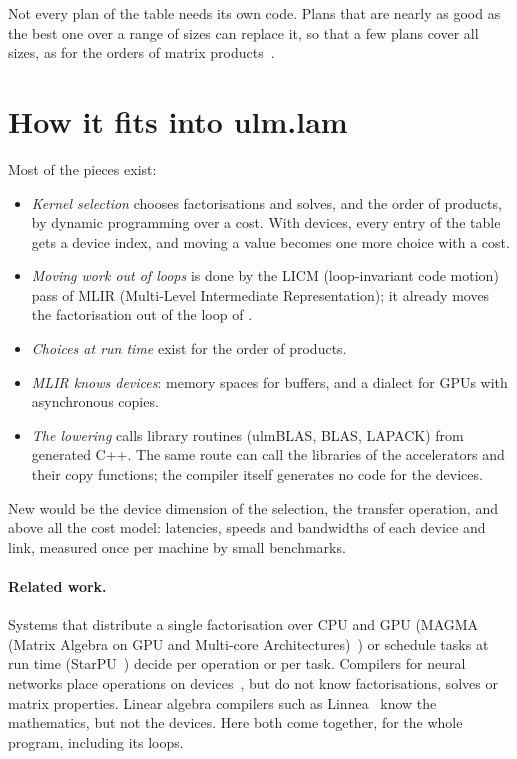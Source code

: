 \documentclass[11pt,a4paper]{article}
\let\origtexttt\texttt
\renewcommand{\texttt}[1]{\highLight[ttbg]{\origtexttt{#1}}}
\begin{document}
Not every plan of the table needs its own code. Plans that are nearly as
good as the best one over a range of sizes can replace it, so that a few
plans cover all sizes, as for the orders of matrix products~\cite{essential}.

\section{How it fits into ulm.lam}

Most of the pieces exist:
\begin{itemize}
\item \emph{Kernel selection} chooses factorisations and solves, and the
  order of products, by dynamic programming over a cost. With devices,
  every entry of the table gets a device index, and moving a value becomes
  one more choice with a cost.
\item \emph{Moving work out of loops} is done by the LICM (loop-invariant
  code motion) pass of MLIR (Multi-Level Intermediate Representation); it
  already moves the factorisation out of the loop of \texttt{fly}.
\item \emph{Choices at run time} exist for the order of products.
\item \emph{MLIR knows devices}: memory spaces for buffers, and a dialect
  for GPUs with asynchronous copies.
\item \emph{The lowering} calls library routines (ulmBLAS, BLAS, LAPACK)
  from generated C++. The same route can call the libraries of the
  accelerators and their copy functions; the compiler itself generates no
  code for the devices.
\end{itemize}
New would be the device dimension of the selection, the transfer operation,
and above all the cost model: latencies, speeds and bandwidths of each
device and link, measured once per machine by small benchmarks.

\paragraph{Related work.} Systems that distribute a single factorisation
over CPU and GPU (MAGMA (Matrix Algebra on GPU and Multi-core
Architectures)~\cite{magma}) or schedule tasks at run time
(StarPU~\cite{starpu}) decide per operation or per task. Compilers for
neural networks place operations on devices~\cite{tarnawski}, but do not
know factorisations, solves or matrix properties. Linear algebra
compilers such as Linnea~\cite{linnea} know the mathematics, but not the
devices. Here both come together, for the whole program, including its
loops.
\end{document}
